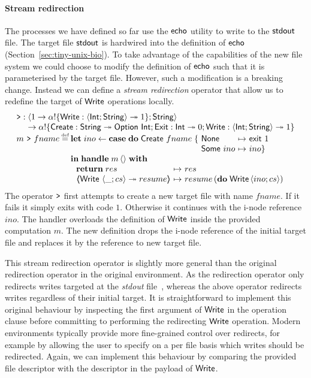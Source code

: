 \documentclass[12pt,phd,lfcs,twoside,openright,logo,leftchapter,normalheadings]{infthesis}
\theoremstyle{plain}
\theoremstyle{definition}
\begin{document}
\paragraph{Stream redirection}
%
The processes we have defined so far use the $\mathsf{echo}$ utility to write
to the $\mathsf{stdout}$ file. The target file $\mathsf{stdout}$ is hardwired into the
definition of $\mathsf{echo}$ (Section~\ref{sec:tiny-unix-bio}). To take
advantage of the capabilities of the new file system we could choose
to modify the definition of $\mathsf{echo}$ such that it is parameterised by
the target file. However, such a modification is a breaking
change. Instead we can define a \emph{stream redirection} operator
that allow us to redefine the target of $\mathsf{Write}$ operations locally.
%
\[
  \bl
  \redirect :
     \bl
       \Record{\UnitType \to \alpha \eff \{\Write : \Record{\Int;\String} \opto \UnitType\}; \String}\\
       \to \alpha \eff \{\UCreate : \String \opto \Option~\Int;\Exit : \Int \opto \ZeroType;\Write : \Record{\Int;\String} \opto \UnitType\}
     \el\\
    m~\redirect~fname \defas
        \ba[t]{@{}l}
        \Let\;ino \revto \Case\;\Do\;\UCreate~fname\;\{
          \ba[t]{@{~}l@{~}c@{~}l}
            \None &\mapsto& \exit~1\\
            \Some~ino &\mapsto& ino\}
          \ea\\
          \In\;\Handle\;m\,\Unit\;\With\\
             ~\ba{@{~}l@{~}c@{~}l}
                 \Return\;res      &\mapsto& res\\
                 \OpCase{\Write}{\Record{\_;cs}}{resume} &\mapsto& resume\,(\Do\;\Write\,\Record{ino;cs})
               \ea
         \ea
  \el
\]
%
The operator $\texttt{>}$ first attempts to create a new target file
with name $fname$. If it fails it simply exits with code
$1$. Otherwise it continues with the i-node reference $ino$. The
handler overloads the definition of $\mathsf{Write}$ inside the provided
computation $m$. The new definition drops the i-node reference of the
initial target file and replaces it by the reference to new target
file.

This stream redirection operator is slightly more general than the
original redirection operator in the original \UNIX{} environment. As
the \UNIX{} redirection operator only redirects writes targeted at the
\emph{stdout} file~\cite{RitchieT74}, whereas the above operator
redirects writes regardless of their initial target.
%
It is straightforward to implement this original \UNIX{} behaviour by
inspecting the first argument of $\mathsf{Write}$ in the operation clause
before committing to performing the redirecting $\mathsf{Write}$ operation.
%
Modern \UNIX{} environments typically provide more fine-grained
control over redirects, for example by allowing the user to specify on
a per file basis which writes should be redirected. Again, we can
implement this behaviour by comparing the provided file descriptor
with the descriptor in the payload of $\mathsf{Write}$.
\end{document}
